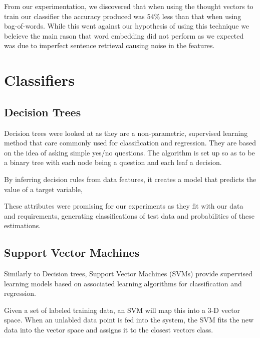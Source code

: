 \documentclass[bsc,frontabs,twoside,singlespacing,parskip,deptreport]{infthesis}     %
\begin{document}


From our experimentation, we discovered that when using the thought vectors to train our classifier the accuracy produced was 54\% less than that when
using bag-of-words. While this went against our hypothesis of using this technique we beleieve
the main rason that word embedding did not perform as we expected was due to imperfect sentence retrieval causing noise in
the features.

\section{Classifiers}
\subsection{Decision Trees}
Decision trees were looked at as they are a non-parametric, supervised learning method that care commonly used for
classification and regression.
They are based on the idea of asking simple yes/no questions. The algorithm is set up so as to be a binary tree with
each node being a question and each leaf a decision.

By inferring decision rules from data features, it creates a model that predicts the value of a target variable,

These attributes were promising for our experiments as they fit with our data and requirements, generating
classifications of test data and probabilities of these estimations.


\subsection{Support Vector Machines}
Similarly to Decision trees, Support Vector Machines (SVMs) provide supervised learning models based on
associated learning algorithms for classification and regression.

Given a set of labeled training data, an SVM will map this into a 3-D vector space.
When an unlabled data point is fed into the system, the SVM fits the new data into the vector space and
assigns  it to the closest vectors class.
\end{document}
